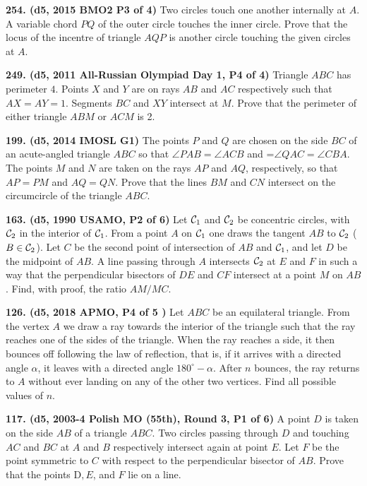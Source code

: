 \documentclass{article}
\begin{document}
\textbf{254. (\color{red}d5\color{black}, 2015 BMO2 P3 of 4)} Two circles touch one another internally at $A$. A variable chord $PQ$ of the outer circle touches the inner circle. Prove that the locus of the incentre of triangle $AQP$ is another circle touching the given circles at $A$.

\textbf{249. (\color{red}d5\color{black}, 2011 All-Russian Olympiad Day 1, P4 of 4)} Triangle $ABC$ has perimeter $4$. Points $X$ and $Y$ are on rays $AB$ and $AC$ respectively such that $AX=AY=1$. Segments $BC$ and $XY$ intersect at $M$. Prove that the perimeter of either triangle $ABM$ or $ACM$ is 2.

\textbf{199. (\color{red}d5\color{black}, 2014 IMOSL G1)} The points \(P\) and \(Q\) are chosen on the side \(BC\) of an acute-angled triangle \(ABC\) so that \(\angle PAB = \angle ACB\) and =\(\angle QAC =\angle CBA\). The points \(M\) and \(N\) are taken on the rays \(AP\) and \(AQ\), respectively, so that \(AP = PM\) and \(AQ = QN\). Prove that the lines \(BM\) and \(CN\) intersect on the circumcircle of the triangle \(ABC\).

\textbf{163. (\color{red}d5\color{black}, 1990 USAMO, P2 of 6)} Let ${\cal C}_1$ and ${\cal C}_2$ be concentric circles, with ${\cal C}_2$ in the interior of ${\cal C}_1$. From a point $A$ on ${\cal C}_1$ one draws the tangent $AB$ to ${\cal C}_2$ ($B\in {\cal C}_2$). Let $C$ be the second point of intersection of $AB$ and ${\cal C}_1$, and let $D$ be the midpoint of $AB$. A line passing through $A$ intersects ${\cal C}_2$ at $E$ and $F$ in such a way that the perpendicular bisectors of $DE$ and $CF$ intersect at a point $M$ on $AB$. Find, with proof, the ratio $AM/MC$.

\textbf{126. (\color{red}d5\color{black}, 2018 APMO, P4 of 5  )} Let $ABC$ be an equilateral triangle. From the vertex $A$ we draw a ray towards the interior of the triangle such that the ray reaches one of the sides of the triangle. When the ray reaches a side, it then bounces off following the law of reflection, that is, if it arrives with a directed angle $\alpha$, it leaves with a directed angle $180^{\circ}-\alpha$. After $n$ bounces, the ray returns to $A$ without ever landing on any of the other two vertices. Find all possible values of $n$.

\textbf{117. (\color{red}d5\color{black}, 2003-4 Polish MO (55th), Round 3, P1 of 6)} A point \(D\) is taken on the side \(AB\) of a triangle \(ABC\). Two circles passing through \(D\) and touching \(AC\) and \(BC\) at \(A\) and \(B\) respectively intersect again at point \(E\). Let \(F\) be the point symmetric to \(C\) with respect to the perpendicular bisector of \(AB\). Prove that the points D\(,E\), and \(F\) lie on a line.
\end{document}
